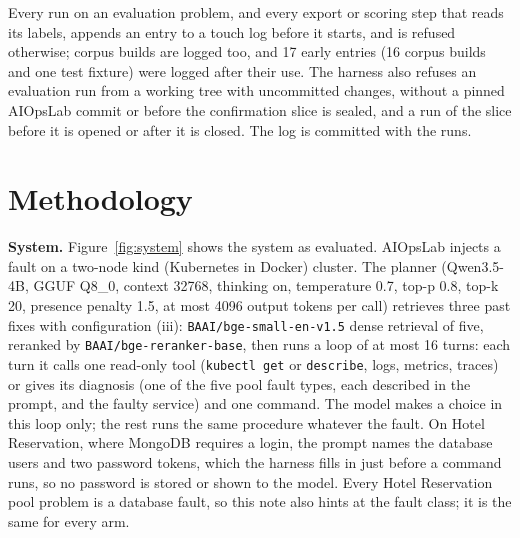 \documentclass[10pt,conference]{IEEEtran}
\newcommand{\code}[1]{\texttt{\upshape #1}}
\begin{document}
\noindent Every run on an evaluation problem, and every export or scoring step that reads its
labels, appends an entry to a touch log before it starts, and is refused otherwise; corpus builds
are logged too, and 17 early entries (16 corpus builds and one test fixture) were logged after
their use. The harness also refuses an evaluation run from a working tree with uncommitted changes,
without a pinned AIOpsLab commit or before the confirmation slice is sealed, and a run of the slice
before it is opened or after it is closed. The log is committed with the runs.

\section{Methodology}



\textbf{System.} Figure~\ref{fig:system} shows the system as evaluated. AIOpsLab injects a fault on
a two-node kind (Kubernetes in Docker) cluster. The planner (Qwen3.5-4B, GGUF Q8\_0, context 32768,
thinking on, temperature 0.7, top-p 0.8, top-k 20, presence penalty 1.5, at most 4096 output tokens
per call)
retrieves three past fixes with configuration (iii): \code{BAAI/bge-small-en-v1.5} dense
retrieval of five, reranked by \code{BAAI/bge-reranker-base}, then runs a loop of at most 16 turns: each turn it calls one read-only tool
(\code{kubectl get} or \code{describe}, logs, metrics, traces) or gives its diagnosis (one of the
five pool fault types, each described in the prompt, and the faulty service) and one command. The
model makes a choice in this loop only; the rest runs the same procedure whatever the fault. On
Hotel Reservation, where MongoDB requires a login, the prompt names the database users and two
password tokens, which the harness fills in just before a command runs, so no password is stored or
shown to the model. Every Hotel Reservation pool problem is a database fault, so this note also
hints at the fault class; it is the same for every arm.
\end{document}

